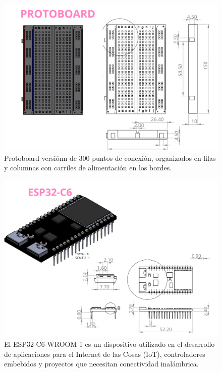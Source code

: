     \begin{figure}[H]
        \centering
        \includegraphics[scale=0.3]{34/img/protoboard.png}
        \caption{Protoboard versiónn de 300 puntos de conexión, organizados en filas y columnas con carriles de alimentación en los bordes.}
        \label{fig:protoboard}
    \end{figure}
    
    \begin{figure}[H]
        \centering
        \includegraphics[scale=0.3]{34/img/esp32C6.png}
        \caption{El ESP32-C6-WROOM-1 es un dispositivo utilizado en el desarrollo de aplicaciones para el Internet de las Cosas (IoT), controladores embebidos y proyectos que necesitan conectividad inalámbrica.}
        \label{fig:esp32C6}
    \end{figure}
    
